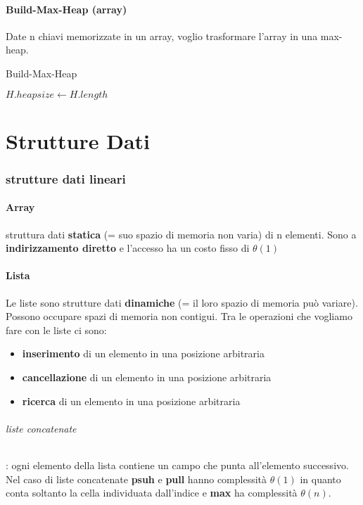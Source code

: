 \documentclass{article}
\DeclarePairedDelimiter\floor{\lfloor}{\rfloor}
\begin{document}
\subsection{Build-Max-Heap (array)} %
Date n chiavi memorizzate in un array, voglio trasformare l'array in una max-heap.

\begin{algorithm}[H]
\caption{Build-Max-Heap}
$H.heapsize \leftarrow H.length$\;
\end{algorithm}



\newpage
\part{Strutture Dati}
\section{strutture dati lineari} %
\subsection{Array} %
struttura dati \textbf{statica} (= suo spazio di memoria non varia) di n elementi. 
Sono a \textbf{indirizzamento diretto} e l'accesso ha un costo fisso di $\theta (1)$

\subsection{Lista} %
Le liste sono strutture dati \textbf{dinamiche} (= il loro spazio di memoria può variare). 
Possono occupare spazi di
 memoria non contigui. Tra le operazioni che vogliamo fare con le liste ci sono:
 \begin{itemize}
    \item \textbf{inserimento} di un elemento in una posizione arbitraria
    \item \textbf{cancellazione} di un elemento in una posizione arbitraria
    \item \textbf{ricerca} di un elemento in una posizione arbitraria
 \end{itemize}
 
 \paragraph{liste concatenate}: ogni elemento della lista contiene un campo che punta all'elemento successivo.
 Nel caso di liste concatenate \textbf{psuh}
e \textbf{pull} hanno complessità $\theta(1)$ in quanto conta soltanto la cella individuata dall'indice
 e \textbf{max} ha complessità $\theta(n)$.
 
\end{document}
